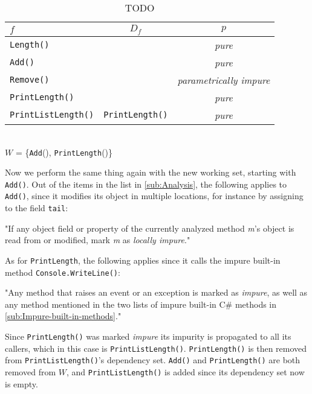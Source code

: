 \documentclass[a4paper,12pt]{article}
\begin{document}
\begin{table}[H]
  \caption{TODO}
  \label{tab:lookup-table2}
  \centering
  \begin{tabular}{|l|c|c|}
    \hline
    $f$                        & $D_f$                  & $p$                     \\ \hline
    \texttt{Length()}          &                        & \textit{pure}                  \\
    \texttt{Add()}             &                        & \textit{pure}                  \\
    \texttt{Remove()}          &                        & \textit{parametrically impure} \\
    \texttt{PrintLength()}     &                        & \textit{pure}                  \\
    \texttt{PrintListLength()} & \texttt{PrintLength()} & \textit{pure}                  \\ \hline
  \end{tabular}
  \\
  $W$ = \{\texttt{Add}(), \texttt{PrintLength}()\}
\end{table}

Now we perform the same thing again with the new working set, starting with \texttt{Add()}. Out of the items in the list in \autoref{sub:Analysis}, the following applies to \texttt{Add()}, since it modifies its object in multiple locations, for instance by assigning to the field \texttt{tail}:

"If any object field or property of the currently analyzed method \textit{m}'s object is read from or modified, mark \textit{m} as \textit{locally impure}."

As for \texttt{PrintLength}, the following applies since it calls the impure built-in method \texttt{Console.WriteLine()}:

"Any method that raises an event or an exception is marked as \textit{impure}, as well as any method mentioned in the two lists of impure built-in C\# methods in \autoref{sub:Impure-built-in-methods}."

Since \texttt{PrintLength()} was marked \textit{impure} its impurity is propagated to all its callers, which in this case is \texttt{PrintListLength()}. \texttt{PrintLength()} is then removed from \texttt{PrintListLength()}'s dependency set. \texttt{Add()} and \texttt{PrintLength()} are both removed from $W$, and \texttt{PrintListLength()} is added since its dependency set now is empty.
\end{document}
